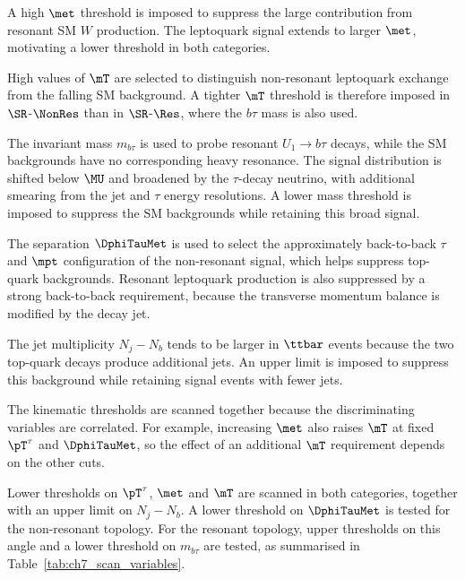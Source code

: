 A high $\met$ threshold is imposed to suppress the large contribution from resonant SM $W$ production.
The leptoquark signal extends to larger $\met$, motivating a lower threshold in both categories.

High values of $\mT$ are selected to distinguish non-resonant leptoquark exchange from the falling SM background.
A tighter $\mT$ threshold is therefore imposed in $\SR$-$\NonRes$ than in $\SR$-$\Res$, where the $b\tau$ mass is also used.

The invariant mass $m_{b\tau}$ is used to probe resonant $U_1\to b\tau$ decays, while the SM backgrounds have no corresponding heavy resonance.
The signal distribution is shifted below $\MU$ and broadened by the $\tau$-decay neutrino, with additional smearing from the jet and $\tau$ energy resolutions.
A lower mass threshold is imposed to suppress the SM backgrounds while retaining this broad signal.

The separation $\DphiTauMet$ is used to select the approximately back-to-back $\tau$ and $\mpt$ configuration of the non-resonant signal, which helps suppress top-quark backgrounds.
Resonant leptoquark production is also suppressed by a strong back-to-back requirement, because the transverse momentum balance is modified by the decay jet.

The jet multiplicity $N_j-N_b$ tends to be larger in $\ttbar$ events because the two top-quark decays produce additional jets.
An upper limit is imposed to suppress this background while retaining signal events with fewer jets.

The kinematic thresholds are scanned together because the discriminating variables are correlated.
For example, increasing $\met$ also raises $\mT$ at fixed $\pT^\tau$ and $\DphiTauMet$, so the effect of an additional $\mT$ requirement depends on the other cuts.

Lower thresholds on $\pT^\tau$, $\met$ and $\mT$ are scanned in both categories, together with an upper limit on $N_j-N_b$.
A lower threshold on $\DphiTauMet$ is tested for the non-resonant topology.
For the resonant topology, upper thresholds on this angle and a lower threshold on $m_{b\tau}$ are tested, as summarised in Table~\ref{tab:ch7_scan_variables}.

